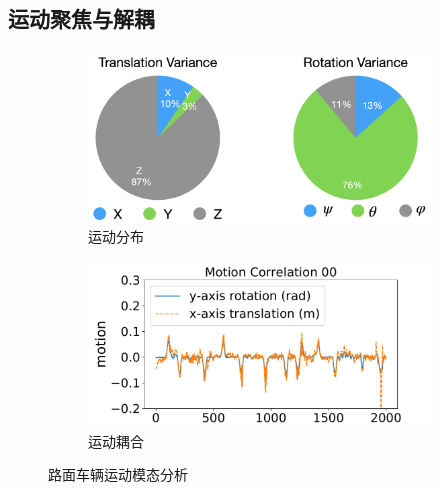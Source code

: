 \subsection{运动聚焦与解耦}
\label{sec:motion}

\begin{figure}[ht]
    \centering
    \begin{subfigure}[b]{0.48\textwidth}
        \includegraphics[width=\textwidth]{datavo/motion_dis.png}
        \caption{运动分布}
        \label{fig:motion_dis} 
    \end{subfigure}
    \begin{subfigure}[b]{0.48\textwidth}
        \includegraphics[width=\textwidth]{datavo/rotation_corr.pdf}
        \caption{运动耦合}
        \label{fig:rotation_corr}
    \end{subfigure}
    \caption{路面车辆运动模态分析}

\end{figure}
